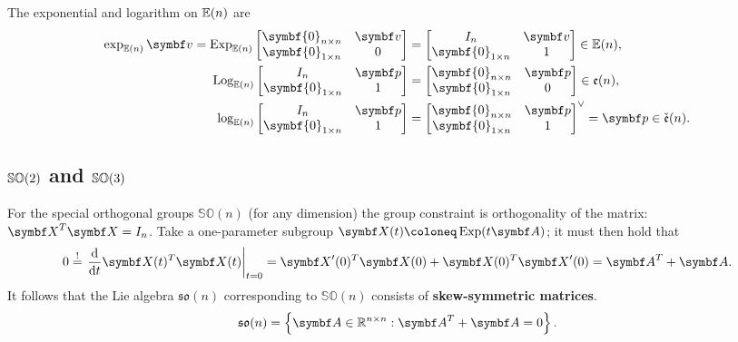 \begin{important}
  The exponential and logarithm on ${\mathbb{E}(n)}$ are
  \begin{subequations}
    \begin{align}
      \exp_{\En} \bv = \Exp_{\En} \begin{bmatrix}
        \symbf{0}_{n \times n} & \bv \\ \symbf{0}_{1 \times n} & 0
      \end{bmatrix} & = \begin{bmatrix} I_n & \bv \\ \symbf{0}_{1 \times n} & 1 \end{bmatrix} \in \En,                                 \\
      \Log_{\En} \begin{bmatrix} I_n & \bp \\ \symbf{0}_{1 \times n} & 1 \end{bmatrix}                  & = \begin{bmatrix}
        \symbf{0}_{n \times n} & \bp \\ \symbf{0}_{1 \times n} & 0
      \end{bmatrix} \in \mathfrak{e}(n),                     \\
      \log_{\En} \begin{bmatrix} I_n & \bp \\ \symbf{0}_{1 \times n} & 1 \end{bmatrix}                  & = \begin{bmatrix} \symbf{0}_{n \times n} & \bp \\ \symbf{0}_{1 \times n} & 1 \end{bmatrix}^\vee = \bp \in \check {\mathfrak{e}}(n).
    \end{align}
  \end{subequations}
\end{important}


\subsection{\texorpdfstring{${\mathbb{SO}(2)}$}{SO(2)} and \texorpdfstring{${\mathbb{SO}(3)}$}{SO(3)}}

For the special orthogonal groups $\mathbb{SO}(n)$ (for any dimension) the group constraint is orthogonality of the matrix: $\X^T \X = I_n$. Take a one-parameter subgroup $\X(t) \coloneq \Exp(t \A)$; it must then hold that
\begin{equation}
  0 \overset{!}= \left. \frac{\mathrm{d}}{\mathrm{d} t} \X(t)^T \X(t) \right|_{t=0} = \X'(0)^T \X(0) + \X(0)^T \X'(0) = \A^T + \A.
\end{equation}
It follows that the Lie algebra $\mathfrak{so}(n)$ corresponding to $\mathbb{SO}(n)$ consists of \textbf{skew-symmetric matrices}.
\begin{equation}
  \mathfrak{so}(n) = \left\{ \A \in \mathbb{R}^{n \times n} : \A^T + \A = 0 \right\}.
\end{equation}

